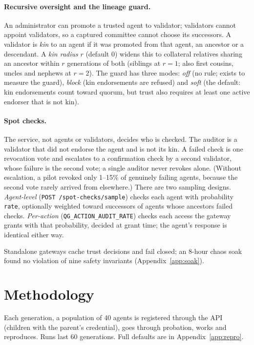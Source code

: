 \documentclass[11pt]{article}
\newcommand{\code}[1]{\texttt{#1}}
\begin{document}
\paragraph{Recursive oversight and the lineage guard.} An administrator can promote a trusted
agent to validator; validators cannot appoint validators, so a captured committee cannot
choose its successors. A validator is \emph{kin} to an agent if it was promoted from that
agent, an ancestor or a descendant. A \emph{kin radius} $r$ (default 0) widens this to
collateral relatives sharing an ancestor within $r$ generations of both (siblings at $r=1$;
also first cousins, uncles and nephews at $r=2$). The guard has three modes: \emph{off}
(no rule; exists to measure the guard), \emph{block} (kin endorsements are refused) and
\emph{soft} (the default: kin endorsements count toward quorum, but trust also requires at
least one active endorser that is not kin).

\paragraph{Spot checks.} The service, not agents or validators, decides who is checked. The
auditor is a validator that did not endorse the agent and is not its kin. A failed check is
one revocation vote and escalates to a confirmation check by a second validator, whose failure
is the second vote; a single auditor never revokes alone. (Without escalation, a pilot revoked
only 1--15\% of genuinely failing agents, because the second vote rarely arrived from
elsewhere.) There are two sampling designs. \emph{Agent-level}
(\code{POST /spot-checks/sample}) checks each agent with probability \code{rate}, optionally
weighted toward successors of agents whose ancestors failed checks. \emph{Per-action}
(\code{QG\_ACTION\_AUDIT\_RATE}) checks each access the gateway grants with that probability,
decided at grant time; the agent's response is identical either way.

Standalone gateways cache trust decisions and fail closed; an 8-hour chaos soak found no
violation of nine safety invariants (Appendix~\ref{app:soak}).

\section{Methodology}
\label{sec:method}

Each generation, a population of 40 agents is registered through the API (children with the
parent's credential), goes through probation, works and reproduces. Runs last 60 generations.
Full defaults are in Appendix~\ref{app:repro}.
\end{document}
